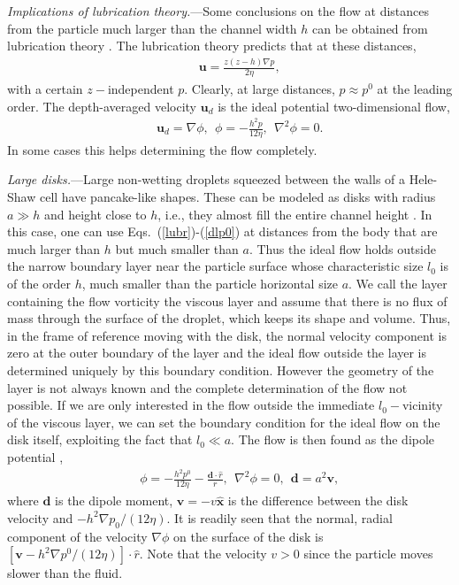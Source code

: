 {\it Implications of lubrication theory.}---Some conclusions on the flow at distances from the particle much larger than the channel width $h$ can be obtained from lubrication theory \citep{Batchelor,lubr,szeri,bruce}. The lubrication theory predicts that at these distances,
\begin{eqnarray}&&
\bm u=\frac{z(z-h)\nabla p}{2\eta},\label{lubr}
\end{eqnarray}
with a certain $z-$independent $p$. Clearly, at large distances, $p\approx p^0$ at the leading order. The depth-averaged velocity $\bm u_d$ is the ideal potential two-dimensional flow,
\begin{eqnarray}&&
\bm u_d=\nabla\phi,\ \ \phi=-\frac{h^2 p}{12\eta},\ \ \nabla^2\phi=0.\label{dlp0}
\end{eqnarray}
In some cases this helps determining the flow completely.

{\it Large disks.}---Large non-wetting droplets squeezed between the walls of a Hele-Shaw cell have pancake-like shapes. These can be modeled as disks with radius $a\gg h$ and height close to $h$, i.e., they almost fill the entire channel height \citep{tlusty,tl2006,tl2012,tl2014}. In this case, one can use Eqs.~(\ref{lubr})-(\ref{dlp0}) at distances from the body that are much larger than $h$ but much smaller than $a$. Thus the ideal flow holds outside the narrow boundary layer near the particle surface whose characteristic size $l_0$ is of the order $h$, much smaller than the particle horizontal size $a$. We call the layer containing the flow vorticity the viscous layer and assume that there is no flux of mass through the surface of the droplet, which keeps its shape and volume. Thus, in the frame of reference moving with the disk, the normal 
velocity component is zero at the outer boundary of the layer and the ideal flow outside the layer is determined uniquely by this boundary condition. However the geometry of the layer is not always known and the complete determination of the flow not possible. If we are only interested in the flow outside the immediate $l_0-$vicinity of the viscous layer,  we can set the boundary condition for the ideal flow on the disk itself, exploiting the fact that $l_0\ll a$. The flow is then found as the dipole potential \citep{tlusty},
\begin{eqnarray}&&
\phi=-\frac{h^2 p^0}{12\eta}-\frac{\bm d\cdot{\hat r}}{r} ,\ \ \nabla^2\phi=0,\ \ \bm d=a^2\bm v,\label{dl}
\end{eqnarray}
where $\bm d$ is the dipole moment, $\bm v=-v\bm{\hat x}$ is the difference between the disk velocity and $-h^2\nabla p_0/(12\eta)$. It is readily seen that the normal, radial component of the velocity $\nabla \phi$ on the surface of the disk is $[\bm v-h^2\nabla p^0/(12\eta)]\cdot{\hat r}$. Note that the velocity $v>0$ since the particle moves slower than the fluid.

